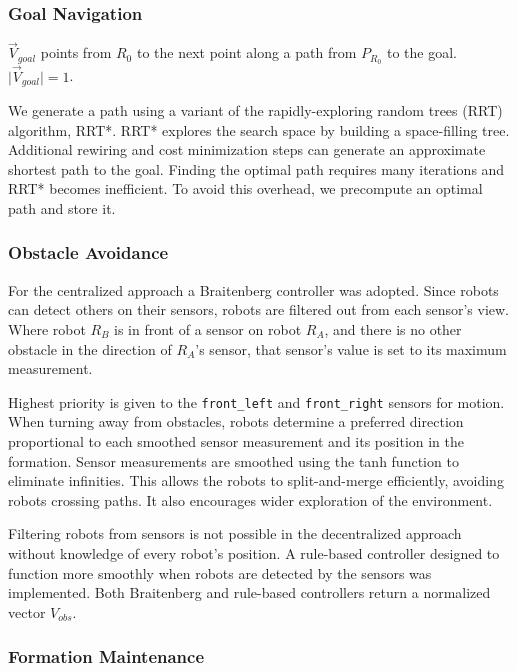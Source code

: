 \documentclass[letterpaper, 10 pt, conference]{ieeeconf}  %
\begin{document}
\subsubsection*{Goal Navigation}

$\vec{V}_{goal}$ points from $R_0$ to the next point along a path from $P_{R_0}$ to the goal. $\vert\vec{V}_{goal}\rvert = 1$.

We generate a path using a variant of the rapidly-exploring random trees (RRT) algorithm, RRT*. RRT* explores the search space by building a space-filling tree. Additional rewiring and cost minimization steps can generate an approximate shortest path to the goal. Finding the optimal path requires many iterations and RRT* becomes inefficient. To avoid this overhead, we precompute an optimal path and store it.

\subsubsection*{Obstacle Avoidance}

For the centralized approach a Braitenberg controller was adopted. Since robots can detect others on their sensors, robots are filtered out from each sensor's view. Where robot $R_B$ is in front of a sensor on robot $R_A$, and there is no other obstacle in the direction of $R_A$'s sensor, that sensor's value is set to its maximum measurement.

Highest priority is given to the \texttt{front\_left} and \texttt{front\_right} sensors for motion. When turning away from obstacles, robots determine a preferred direction proportional to each smoothed sensor measurement and its position in the formation. Sensor measurements are smoothed using the tanh function to eliminate infinities. This allows the robots to split-and-merge efficiently, avoiding robots crossing paths. It also encourages wider exploration of the environment.

Filtering robots from sensors is not possible in the decentralized approach without knowledge of every robot's position. A rule-based controller designed to function more smoothly when robots are detected by the sensors was implemented. Both Braitenberg and rule-based controllers return a normalized vector $V_{obs}$.

\subsubsection*{Formation Maintenance}
\end{document}

